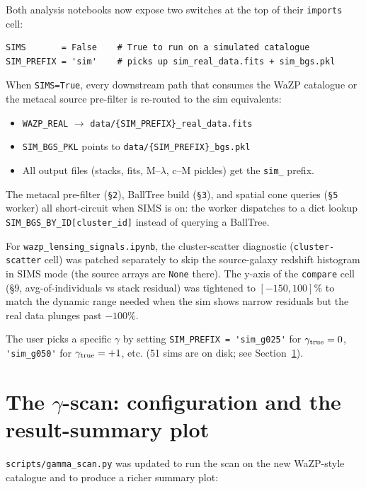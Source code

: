\documentclass[11pt,a4paper]{article}
\newcommand{\gtrue}{\gamma_{\rm true}}
\begin{document}
Both analysis notebooks now expose two switches at the top of their
\verb|imports| cell:
\begin{verbatim}
SIMS       = False    # True to run on a simulated catalogue
SIM_PREFIX = 'sim'    # picks up sim_real_data.fits + sim_bgs.pkl
\end{verbatim}
When \verb|SIMS=True|, every downstream path that consumes the WaZP
catalogue or the metacal source pre-filter is re-routed to the
sim equivalents:
\begin{itemize}
\item \verb|WAZP_REAL| $\to$ \verb|data/{SIM_PREFIX}_real_data.fits|
\item \verb|SIM_BGS_PKL| points to \verb|data/{SIM_PREFIX}_bgs.pkl|
\item All output files (stacks, fits, M--$\lambda$, c--M pickles) get the
      \verb|sim_| prefix.
\end{itemize}
The metacal pre-filter (\verb|§2|), BallTree build (\verb|§3|), and
spatial cone queries (\verb|§5| worker) all short-circuit when SIMS is
on: the worker dispatches to a dict lookup
\verb|SIM_BGS_BY_ID[cluster_id]| instead of querying a BallTree.

For \verb|wazp_lensing_signals.ipynb|, the cluster-scatter
diagnostic (\verb|cluster-scatter| cell) was patched separately to
skip the source-galaxy redshift histogram in SIMS mode (the source
arrays are \verb|None| there). The y-axis of the \verb|compare| cell
(§9, avg-of-individuals vs stack residual) was tightened to
$[-150, 100]\%$ to match the dynamic range needed when the sim shows
narrow residuals but the real data plunges past $-100\%$.

The user picks a specific $\gamma$ by setting \verb|SIM_PREFIX = 'sim_g025'|
for $\gtrue = 0$, \verb|'sim_g050'| for $\gtrue = +1$, etc. (51 sims
are on disk; see Section~\ref{sec:scan}).


\section{The $\gamma$-scan: configuration and the result-summary plot}
\label{sec:scan}

\verb|scripts/gamma_scan.py| was updated to run the scan on the new
WaZP-style catalogue and to produce a richer summary plot:
\end{document}

